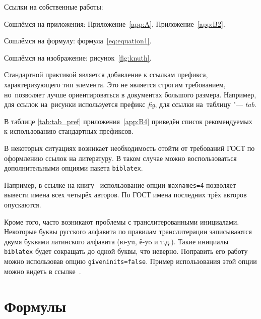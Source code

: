 %

Ссылки на собственные работы:%

Сошлёмся на приложения: Приложение~\cref{app:A}, Приложение~\cref{app:B2}.

Сошлёмся на формулу: формула~\cref{eq:equation1}.

Сошлёмся на изображение: рисунок~\cref{fig:knuth}.

Стандартной практикой является добавление к ссылкам префикса, характеризующего тип элемента.
Это не является строгим требованием, но~позволяет лучше ориентироваться в документах большого размера.
Например, для ссылок на~рисунки используется префикс \textit{fig},
для ссылки на~таблицу "--- \textit{tab}.

В таблице \cref{tab:tab_pref} приложения~\cref{app:B4} приведён список рекомендуемых
к использованию стандартных префиксов.

В некоторых ситуациях возникает необходимость отойти от требований ГОСТ по оформлению ссылок на
литературу.
В таком случае можно воспользоваться дополнительными опциями пакета \verb+biblatex+.

Например, в ссылке на книгу~\cite{sobenin_kdv} использование опции \verb+maxnames=4+ позволяет
вывести имена всех четырёх авторов.
По ГОСТ имена последних трёх авторов опускаются.

Кроме того, часто возникают проблемы с транслитерованными инициалами. Некоторые буквы русского
алфавита по правилам транслитерации записываются двумя буквами латинского алфавита (ю-yu, ё-yo и
т.д.).
Такие инициалы \verb+biblatex+ будет сокращать до одной буквы, что неверно.
Поправить его работу можно использовав опцию \verb+giveninits=false+.
Пример использования этой опции можно видеть в ссылке~\cite{initials}.

\section{Формулы}%

